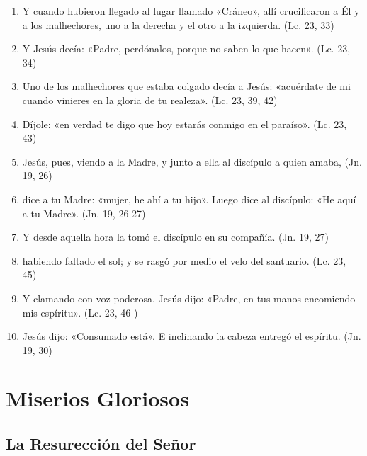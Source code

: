 \documentclass[a4paper,11pt]{article}
\begin{document}
      \begin{enumerate}
        \item Y cuando hubieron llegado al lugar llamado «Cráneo», allí crucificaron a Él y a los malhechores, uno a la derecha y el otro a la izquierda. (Lc. 23, 33)

        \item Y Jesús decía: «Padre, perdónalos, porque no saben lo que hacen». (Lc. 23, 34)

        \item Uno de los malhechores que estaba colgado decía a Jesús: «acuérdate de mi cuando vinieres en la gloria de tu realeza». (Lc. 23, 39, 42)

        \item Díjole: «en verdad te digo que hoy estarás conmigo en el paraíso». (Lc. 23, 43)

        \item Jesús, pues, viendo a la Madre, y junto a ella al discípulo a quien amaba, (Jn. 19, 26)

        \item dice a tu Madre: «mujer, he ahí a tu hijo». Luego dice al discípulo: «He aquí a tu Madre». (Jn. 19, 26-27)

        \item Y desde aquella hora la tomó el discípulo en su compañía. (Jn. 19, 27)

        \item habiendo faltado el sol; y se rasgó por medio el velo del santuario. (Lc. 23, 45)

        \item Y clamando con voz poderosa, Jesús dijo: «Padre, en tus manos encomiendo mis espíritu». (Lc. 23, 46 )

        \item Jesús dijo: «Consumado está». E inclinando la cabeza entregó el espíritu. (Jn. 19, 30)

      \end{enumerate}

    \newpage
         
  \section*{\hfil Miserios Gloriosos \hfil}
    \subsection*{\hfil La Resurección del Señor \hfil}
      
\end{document}
